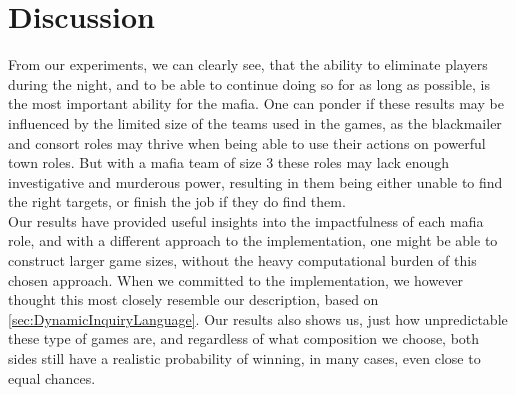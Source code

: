 \section{Discussion}\label{sec:discussion}
From our experiments, we can clearly see, that the ability to eliminate players during the
night, and to be able to continue doing so for as long as possible, is the most
important ability for the mafia. One can ponder if these results may be
influenced by the limited size of the teams used in the games, as the
blackmailer and consort roles may thrive when being able to use their actions
on powerful town roles. But with a mafia team of size 3 these roles may lack
enough investigative and murderous power, resulting in them being either unable
to find the right targets, or finish the job if they do find them.\\ Our
results have provided useful insights into the impactfulness of each mafia
role, and with a different approach to the implementation, one might be able to
construct larger game sizes, without the heavy computational burden of this
chosen approach. When we committed to the implementation, we however thought this most closely resemble our description, based on \cref{sec:DynamicInquiryLanguage}. Our results also shows us, just how unpredictable these type
of games are, and regardless of what composition we choose, both sides still
have a realistic probability of winning, in many cases, even close to equal
chances.

